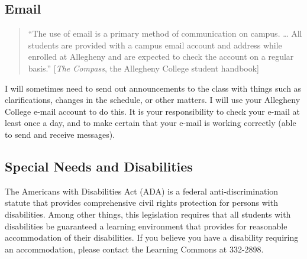 
\subsection*{Email}
\begin{quote}
``The use of email is a primary method of communication on campus. \ldots
All students are provided with a campus email account and address while
enrolled at Allegheny and are expected to check the account on a regular
basis.'' [{\em The Compass}, the Allegheny College student handbook]
\end{quote}
I will sometimes need to send out announcements to the class with
things such as clarifications, changes in the
schedule, or other matters. I will use your Allegheny College e-mail account
to do this. It is your responsibility to check your e-mail at least once a
day, and to make certain that your e-mail is working correctly (able to send
and receive messages).

\subsection*{Special Needs and Disabilities}
The Americans with Disabilities Act (ADA) is a federal anti-discrimination
statute that provides comprehensive civil rights protection for persons
with disabilities. Among other things, this legislation requires that
all students with disabilities be guaranteed a learning environment
that provides for reasonable accommodation of their disabilities.
If you believe  you have a disability requiring an accommodation,
please contact the Learning Commons at 332-2898.


